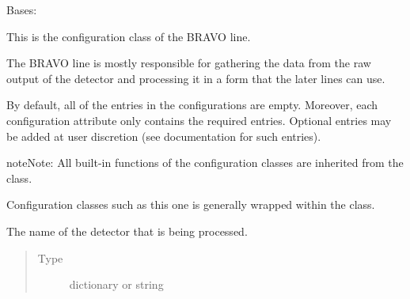 \documentclass[letterpaper,10pt,english]{sphinxmanual}
\begin{document}
\begin{fulllineitems}
\label{\detokenize{python_docstrings/IfA_Smeargle.yankee.configuration_classes.BravoConfig_file:IfA_Smeargle.yankee.configuration_classes.BravoConfig_file.BravoConfig}}
Bases: {\hyperref[\detokenize{python_docstrings/IfA_Smeargle.yankee.configuration_classes.BaseConfig_file:IfA_Smeargle.yankee.configuration_classes.BaseConfig_file.BaseConfig}]{}}

This is the configuration class of the BRAVO line.

The BRAVO line is mostly responsible for gathering the data from the
raw output of the detector and processing it in a form that the later
lines can use.

By default, all of the entries in the configurations are empty. Moreover,
each configuration attribute only contains the required entries. Optional
entries may be added at user discretion (see documentation for such
entries).

\begin{sphinxadmonition}{note}{Note:}
All built-in functions of the configuration classes are inherited from the
{\hyperref[\detokenize{python_docstrings/IfA_Smeargle.yankee.configuration_classes.BaseConfig_file:IfA_Smeargle.yankee.configuration_classes.BaseConfig_file.BaseConfig}]{}}
class.

Configuration classes such as this one is generally wrapped within the
{\hyperref[\detokenize{python_docstrings/IfA_Smeargle.yankee.yankee_main:IfA_Smeargle.yankee.yankee_main.SmeargleConfig}]{}} class.
\end{sphinxadmonition}

\begin{fulllineitems}
\label{\detokenize{python_docstrings/IfA_Smeargle.yankee.configuration_classes.BravoConfig_file:IfA_Smeargle.yankee.configuration_classes.BravoConfig_file.BravoConfig.detector_name}}
The name of the detector that is being processed.
\begin{quote}\begin{description}
\item[{Type}] \leavevmode
dictionary or string


\end{description}
\end{quote}
\end{fulllineitems}
\end{fulllineitems}
\end{document}
